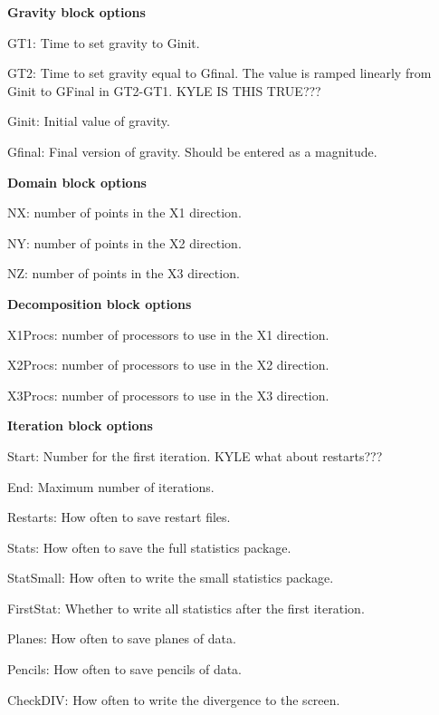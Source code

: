 \textbf{Gravity block options}
\begin{description}
  \item GT1: Time to set gravity to Ginit.
  \item GT2: Time to set gravity equal to Gfinal. The value is ramped linearly
             from Ginit to GFinal in GT2-GT1. KYLE IS THIS TRUE???
  \item Ginit: Initial value of gravity.
  \item Gfinal: Final version of gravity. Should be entered as a magnitude.
\end{description}

\textbf{Domain block options}
\begin{description}
  \item NX: number of points in the X1 direction.
  \item NY: number of points in the X2 direction.
  \item NZ: number of points in the X3 direction.
\end{description}

\textbf{Decomposition block options}
\begin{description}
  \item X1Procs: number of processors to use in the X1 direction.
  \item X2Procs: number of processors to use in the X2 direction.
  \item X3Procs: number of processors to use in the X3 direction.
\end{description}

\textbf{Iteration block options}
\begin{description}
  \item Start: Number for the first iteration. KYLE what about restarts???
  \item End: Maximum number of iterations.
  \item Restarts: How often to save restart files.
  \item Stats: How often to save the full statistics package.
  \item StatSmall: How often to write the small statistics package.
  \item FirstStat: Whether to write all statistics after the first iteration.
  \item Planes: How often to save planes of data.
  \item Pencils: How often to save pencils of data.
  \item CheckDIV: How often to write the divergence to the screen.
\end{description}

